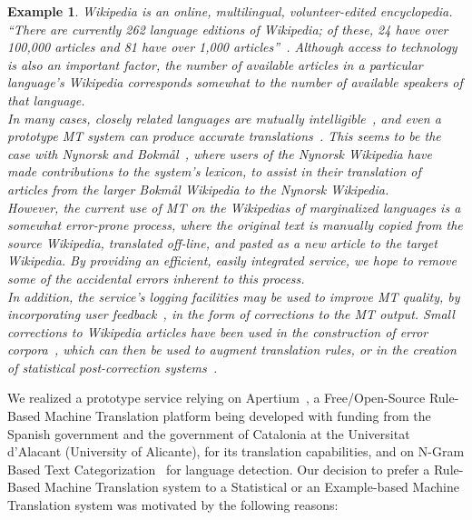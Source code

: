 \documentclass[11pt]{article}
\newtheorem{ex}[theo]{Example}
\begin{document}
\begin{ex}
Wikipedia is an online, multilingual, volunteer-edited encyclopedia. ``There are currently 262 language editions of Wikipedia; of these, 24 have over 100,000 articles and 81 have over 1,000 articles''~\citep{wikipedia}. Although access to technology is also an important factor, the number of available articles in a particular language's Wikipedia corresponds somewhat to the number of available speakers of that language. \\

In many cases, closely related languages are mutually intelligible~\citep{tyers09a}, and even a prototype MT system can produce accurate translations~\citep{oller06}. This seems to be the case with Nynorsk and Bokmål~\citep{unhammer09}, where users of the Nynorsk Wikipedia have made contributions to the system's lexicon, to assist in their translation of articles from the larger Bokmål  Wikipedia to the Nynorsk Wikipedia.\\

However, the current use of MT on the Wikipedias of marginalized languages is a somewhat error-prone process, where the original text is manually copied from the source Wikipedia, translated off-line, and pasted as a new article to the target Wikipedia. By providing an efficient, easily integrated service, we hope to remove some of the accidental errors inherent to this process.\\

In addition, the service's logging facilities may be used to improve MT quality, by incorporating user feedback~\citep{google}, in the form of corrections to the MT output. Small corrections to Wikipedia articles have been used in the construction of error corpora~\citep{milek08}, which can then be used to augment translation rules, or in the creation of statistical post-correction systems~\citep{dugast07}.
\end{ex}

We realized a prototype service relying on Apertium~\citep{armentano05p}, a Free/Open-Source Rule-Based Machine Translation platform being developed with funding from the Spanish government and the government of Catalonia at the Universitat d'Alacant (University of Alicante), for its translation capabilities, and on N-Gram Based Text Categorization~\citep{textcat} for language detection. Our decision to prefer a Rule-Based Machine Translation system to a Statistical or an Example-based Machine Translation system was motivated by the following reasons:
\end{document}
